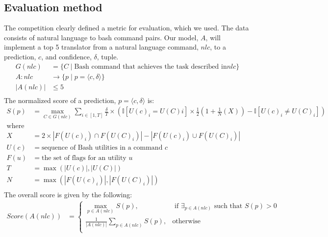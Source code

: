 \documentclass{article}
\newcommand{\abs}[1]{\left| #1\right|}
\begin{document}
\subsection{Evaluation method}
The competition clearly defined a metric for evaluation, which we used. The
data consists of natural language to bash command pairs. Our model, $A$,
will implement a top 5 translator from a natural language command, $nlc$, to a
prediction, $c$, and confidence, $\delta$, tuple.
\[
	\begin{aligned}
		G(nlc)
		 & =\{C\mid \text{Bash command that achieves the task described in} nlc\} \\
		A : nlc
		 & \rightarrow \{p \mid p = \langle c, \delta\rangle\}                    \\
		|A(nlc)|
		 & \le 5                                                                  \\
	\end{aligned}
\]
The normalized score of a prediction, $p=\langle c, \delta\rangle$ is:
\[
	\begin{aligned}
		S(p)
		 & = \max_{C\in G(nlc)}\sum_{i\in[1,T]}\frac{\delta}{T}\times\left(
		\mathbb{I}[U(c)_i=U(C)i]\times\frac{1}{2}\left(
			1+\frac{1}{N}\left(X\right)\right) -\mathbb{I}[U(c)_i\ne U(C)_i]
		\right)                                                                    \\
		\text{where}
		 &                                                                         \\
		X
		 & = 2\times \abs{F(U(c)_i)\cap F(U(C)_i)} - \abs{F(U(c)_i)\cup F(U(C)_i)} \\
		U(c)
		 & = \text{sequence of Bash utilities in a command $c$}                    \\
		F(u)
		 & = \text{the set of flags for an utility $u$}                            \\
		T
		 & = \max\left(\abs{U(c)}, \abs{U(C)}\right)                               \\
		N
		 & = \max\left(\abs{F(U(c)_i)}, \abs{F(U(C)_i)}\right)                     \\
	\end{aligned}
\]
The overall score is given by the following:
\[
	\begin{aligned}
		Score(A(nlc))
		 & =
		\begin{cases}
			\max_{p\in A(nlc)}S(p),
			 & \text{ if }\exists_{p\in A(nlc)}\text{ such that }S(p) > 0 \\
			\frac{1}{\abs{A(nlc)}}\sum_{p\in A(nlc)}S(p),
			 & \text{otherwise}                                           \\
		\end{cases}
	\end{aligned}
\]
\end{document}
